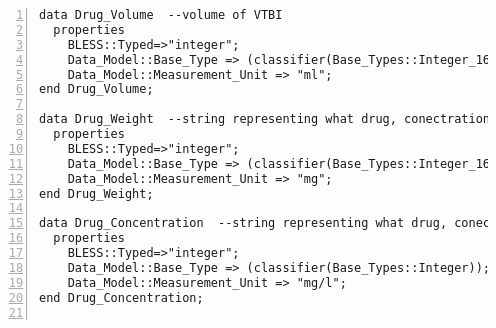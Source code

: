 \begin{lstlisting}[language=aadl, gobble=0, numbers=left, caption={\lstinline{PCA_Types} package}]
data Drug_Volume  --volume of VTBI
  properties
    BLESS::Typed=>"integer";
    Data_Model::Base_Type => (classifier(Base_Types::Integer_16));
    Data_Model::Measurement_Unit => "ml";
end Drug_Volume;  

data Drug_Weight  --string representing what drug, conectration, and volume is in the reservoir
  properties
    BLESS::Typed=>"integer";
    Data_Model::Base_Type => (classifier(Base_Types::Integer_16));
    Data_Model::Measurement_Unit => "mg";
end Drug_Weight;

data Drug_Concentration  --string representing what drug, conectration, and volume is in the reservoir
  properties
    BLESS::Typed=>"integer";
    Data_Model::Base_Type => (classifier(Base_Types::Integer));
    Data_Model::Measurement_Unit => "mg/l";
end Drug_Concentration;


\end{lstlisting}
